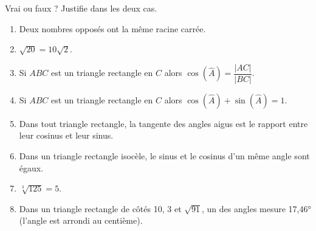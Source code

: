 %
%
    Vrai ou faux ? Justifie dans les deux cas.
    \begin{enumerate}[itemsep=1em]
        \item Deux nombres opposés ont la même racine carrée.
        \item \(\sqrt{20}=10\sqrt{2}\).
        \item Si \(ABC\) est un triangle rectangle en \(C\) alors \(\cos\left(\widehat{A}\right) = \dfrac{|AC|}{|BC|}\).
        \item Si \(ABC\) est un triangle rectangle en \(C\) alors \(\cos\left(\widehat{A}\right) + \sin\left(\widehat{A}\right)=1\).
        \item Dans tout triangle rectangle, la tangente des angles aigus est le rapport entre leur cosinus et leur sinus.
        \item Dans un triangle rectangle isocèle, le sinus et le cosinus d'un même angle sont égaux.
        \item \(\sqrt[3]{125}=5\).
        \item Dans un triangle rectangle de côtés 10, 3 et \(\sqrt{91}\), un des angles mesure \ang{17,46} (l'angle est arrondi au centième).
    \end{enumerate}
